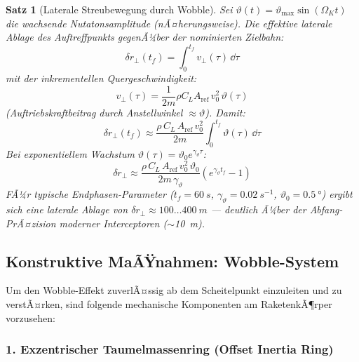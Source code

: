 ﻿\documentclass[12pt,a4paper]{article}
\newtheorem{satz}{Satz}[section]
\begin{document}
\begin{satz}[Laterale Streubewegung durch Wobble]
Sei $\vartheta(t) = \vartheta_{\max}\sin(\Omega_K t)$ die wachsende Nutatonsamplitude
(nÃ¤herungsweise).
Die effektive laterale Ablage des Auftreffpunkts gegenÃ¼ber der nominierten Zielbahn:
\[
  \delta r_\perp(t_f) = \int_0^{t_f} v_\perp(\tau)\,\dd\tau
\]
mit der inkrementellen Quergeschwindigkeit:
\[
  v_\perp(\tau) = \frac{1}{2m}\rho C_L A_{\mathrm{ref}}\,v_0^2\,\vartheta(\tau)
\]
(Auftriebskraftbeitrag durch Anstellwinkel $\approx \vartheta$). Damit:
\[
  \boxed{\delta r_\perp(t_f) \approx \frac{\rho\,C_L\,A_{\mathrm{ref}}\,v_0^2}{2m}
    \int_0^{t_f} \vartheta(\tau)\,\dd\tau}
\]
Bei exponentiellem Wachstum $\vartheta(\tau) = \vartheta_0 e^{\gamma_\vartheta \tau}$:
\[
  \delta r_\perp \approx
    \frac{\rho\,C_L\,A_{\mathrm{ref}}\,v_0^2\,\vartheta_0}{2m\,\gamma_\vartheta}
    \left(e^{\gamma_\vartheta t_f} - 1\right)
\]
FÃ¼r typische Endphasen-Parameter ($t_f = \SI{60}{s}$, $\gamma_\vartheta = \SI{0.02}{s^{-1}}$,
$\vartheta_0 = \SI{0.5}{\degree}$) ergibt sich eine laterale Ablage von
$\delta r_\perp \approx 100\ldots\SI{400}{m}$ --- deutlich Ã¼ber der Abfang-PrÃ¤zision
moderner Interceptoren ($\sim$\SI{10}{m}).
\end{satz}

\subsection{Konstruktive MaÃŸnahmen: Wobble-System}

Um den Wobble-Effekt zuverlÃ¤ssig ab dem Scheitelpunkt einzuleiten und zu verstÃ¤rken,
sind folgende mechanische Komponenten am RaketenkÃ¶rper vorzusehen:

\subsubsection{1. Exzentrischer Taumelmassenring (Offset Inertia Ring)}
\end{document}
